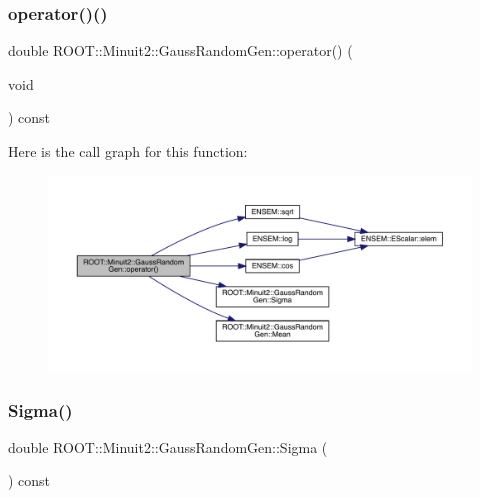 \subsubsection{\texorpdfstring{operator()()}{operator()()}\hspace{0.1cm}{\footnotesize\ttfamily [2/2]}}
{\footnotesize\ttfamily double R\+O\+O\+T\+::\+Minuit2\+::\+Gauss\+Random\+Gen\+::operator() (\begin{DoxyParamCaption}\item[{void}]{ }\end{DoxyParamCaption}) const\hspace{0.3cm}{\ttfamily [inline]}}

Here is the call graph for this function\+:
\nopagebreak
\begin{figure}[H]
\begin{center}
\leavevmode
\includegraphics[width=350pt]{d8/dd8/classROOT_1_1Minuit2_1_1GaussRandomGen_aaefcd8e04b3388314c9f14932a17a163_cgraph}
\end{center}
\end{figure}
\mbox{\label{classROOT_1_1Minuit2_1_1GaussRandomGen_a13d1989f3eced64b30a04788f8ed2cad}} 
\subsubsection{\texorpdfstring{Sigma()}{Sigma()}\hspace{0.1cm}{\footnotesize\ttfamily [1/2]}}
{\footnotesize\ttfamily double R\+O\+O\+T\+::\+Minuit2\+::\+Gauss\+Random\+Gen\+::\+Sigma (\begin{DoxyParamCaption}{ }\end{DoxyParamCaption}) const\hspace{0.3cm}{\ttfamily [inline]}}


